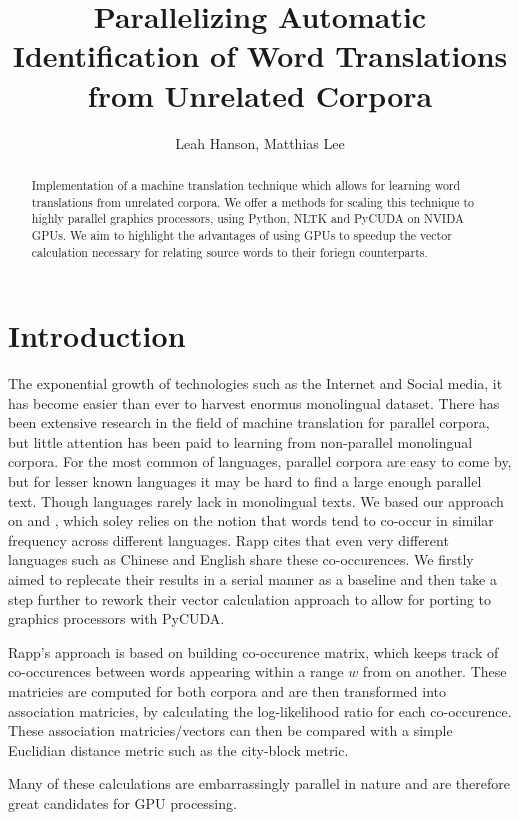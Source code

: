 \documentclass[12pt]{article}
\title{Parallelizing Automatic Identification of Word Translations from Unrelated Corpora}
\author{Leah Hanson, Matthias Lee}
\begin{document}
\maketitle
\begin{abstract}

Implementation of a machine translation technique which allows for learning word translations from unrelated corpora. We offer a methods for scaling this technique to highly parallel graphics processors, using Python, NLTK and PyCUDA on NVIDA GPUs. We aim to highlight the advantages of using GPUs to speedup the vector calculation necessary for relating source words to their foriegn counterparts.

\end{abstract}
\section{Introduction}

The exponential growth of technologies such as the Internet and Social media, it has become easier than ever to harvest enormus monolingual dataset. There has been extensive research in the field of machine translation for parallel corpora, but little attention has been paid to learning from non-parallel monolingual corpora. For the most common of languages, parallel corpora are easy to come by, but for lesser known languages it may be hard to find a large enough parallel text. Though languages rarely lack in monolingual texts. We based our approach on \cite{rapp1999automatic} and \cite{rapp1995identifying}, which soley relies on the notion that words tend to co-occur in similar frequency across different languages. Rapp cites that even very different languages such as Chinese and English share these co-occurences. We firstly aimed to replecate their results in a serial manner as a baseline and then take a step further to rework their vector calculation approach to allow for porting to graphics processors with PyCUDA. 

Rapp's approach is based on building co-occurence matrix, which keeps track of co-occurences between words appearing within a range $w$ from on another. These matricies are computed for both corpora and are then transformed into association matricies, by calculating the log-likelihood ratio for each co-occurence. These association matricies/vectors can then be compared with a simple Euclidian distance metric such as the city-block metric.

Many of these calculations are embarrassingly parallel in nature and are therefore great candidates for GPU processing.
\end{document}
